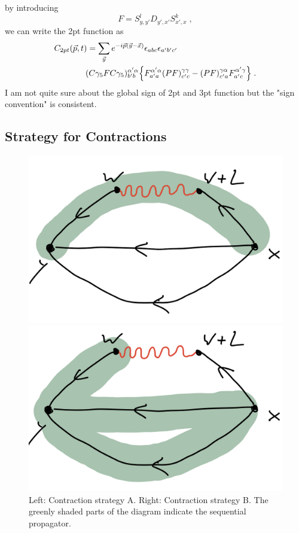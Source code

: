 \documentclass[a4paper,10pt]{scrartcl}
\begin{document}
by introducing
\begin{equation}
    F = S^l_{y,y'} D_{y',x'} S^k_{x',x} \;,
\end{equation}
we can write the 2pt function as 
\begin{align}
    C_{2pt}(\vec p,t) = \sum_{\vec y} e^{-i \vec p (\vec y - \vec x)} &\epsilon_{abc} \epsilon_{a'b'c'} \notag \\
    (C\gamma_5 F C\gamma_5)^{\alpha' \alpha}_{b'b} \Big \lbrace & F^{\alpha' \alpha}_{a'a} (PF)^{\gamma \gamma}_{c'c} - (PF)^{\gamma \alpha}_{c'a} F^{\alpha' \gamma}_{a'c} \Big \rbrace \;.
\end{align}
I am not quite sure about the global sign of 2pt and 3pt function but the "sign convention" is consistent.
\subsection{Strategy for Contractions}
\begin{figure}[ht]
    \begin{minipage}[b]{0.45\linewidth}
    \centering
    \includegraphics[width=\textwidth]{stratA.png}
    \end{minipage}
    \hspace{0.5cm}
    \begin{minipage}[b]{0.45\linewidth}
    \centering
    \includegraphics[width=\textwidth]{stratB.png}
    \end{minipage}
    \caption{Left: Contraction strategy A. Right: Contraction strategy B. The greenly shaded parts of the diagram indicate the sequential propagator.}
\end{figure}
\end{document}
